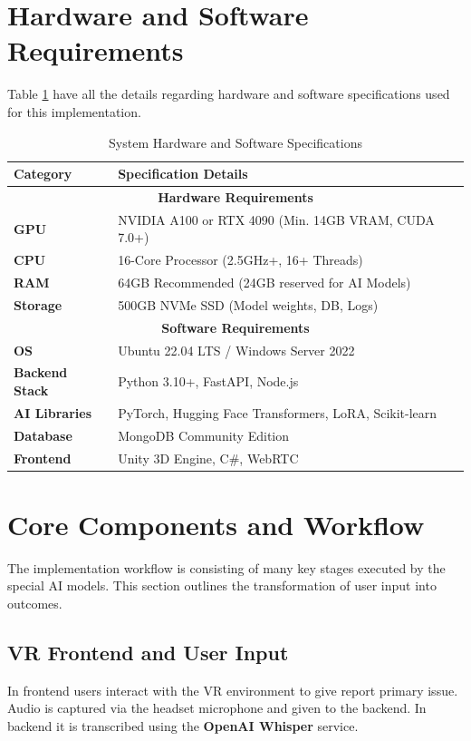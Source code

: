 \newpage
\section{Hardware and Software Requirements}
Table \ref{tab:sys_reqs} have all the details regarding hardware and software specifications used for this implementation.

\begin{table}[H]
\centering
\renewcommand{\arraystretch}{1.4}
\begin{tabular}{|p{}|p{}|}
\hline
\rowcolor{gray!15} \textbf{Category} & \textbf{Specification Details} \\ \hline
\multicolumn{2}{|c|}{\textbf{Hardware Requirements}} \\ \hline
\textbf{GPU} & NVIDIA A100 or RTX 4090 (Min. 14GB VRAM, CUDA 7.0+) \\ \hline
\textbf{CPU} & 16-Core Processor (2.5GHz+, 16+ Threads) \\ \hline
\textbf{RAM} & 64GB Recommended (24GB reserved for AI Models) \\ \hline
\textbf{Storage} & 500GB NVMe SSD (Model weights, DB, Logs) \\ \hline
\multicolumn{2}{|c|}{\textbf{Software Requirements}} \\ \hline
\textbf{OS} & Ubuntu 22.04 LTS / Windows Server 2022 \\ \hline
\textbf{Backend Stack} & Python 3.10+, FastAPI, Node.js \\ \hline
\textbf{AI Libraries} & PyTorch, Hugging Face Transformers, LoRA, Scikit-learn \\ \hline
\textbf{Database} & MongoDB Community Edition \\ \hline
\textbf{Frontend} & Unity 3D Engine, C\#, WebRTC \\ \hline
\end{tabular}
\caption{System Hardware and Software Specifications}
\label{tab:sys_reqs}
\end{table}

\section{Core Components and Workflow}
The implementation workflow is consisting of many key stages executed by the special AI models. This section outlines the transformation of user input into outcomes.

\subsection{VR Frontend and User Input}
In frontend users interact with the VR environment to give report primary issue. Audio is captured via the headset microphone and given to the backend. In backend it is transcribed using the \textbf{OpenAI Whisper} service.

